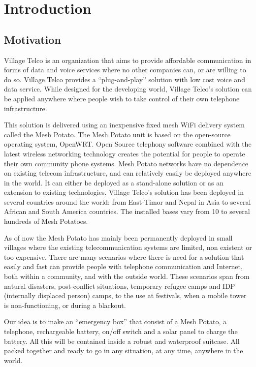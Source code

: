 \chapter{Introduction}
\label{chp:introduction} 

\section{Motivation}
Village Telco is an organization that aims to provide affordable communication in forms of data and voice services where no other companies can, or are willing to do so. Village Telco provides a “plug-and-play” solution with low cost voice and data service. While designed for the developing world, Village Telco’s solution can be applied anywhere where people wish to take control of their own telephone infrastructure.

This solution is delivered using an inexpensive fixed mesh WiFi delivery system called the Mesh Potato. The Mesh Potato unit is based on the open-source operating system, OpenWRT. Open Source telephony software combined with the latest wireless networking technology creates the potential for people to operate their own community phone systems. Mesh Potato networks have no dependence on existing telecom infrastructure, and can relatively easily be deployed anywhere in the world. It can either be deployed as a stand-alone solution or as an extension to existing technologies. Village Telco’s solution has been deployed in several countries around the world: from East-Timor and Nepal in Asia to several African and South America countries. The installed bases vary from 10 to several hundreds of Mesh Potatoes. 

As of now the Mesh Potato has mainly been permanently deployed in small villages where the existing telecommunication systems are limited, non existent or too expensive. There are many scenarios where there is need for a solution that easily and fast can provide people with telephone communication and Internet, both within a community, and with the outside world. These scenarios span from natural disasters, post-conflict situations, temporary refugee camps and IDP (internally displaced person) camps, to the use at festivals, when a mobile tower is non-functioning, or during a blackout. 

Our idea is to make an “emergency box” that consist of a Mesh Potato, a telephone, rechargeable battery, on/off switch and a solar panel to charge the battery. All this will be contained inside a robust and waterproof suitcase. All packed together and ready to go in any situation, at any time, anywhere in the world. 

